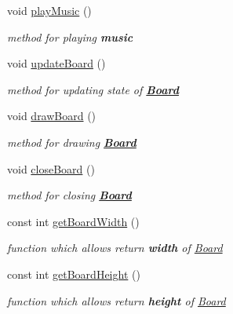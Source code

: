 \begin{DoxyCompactItemize}
\mbox{\label{class_board_ac7e87d3753a7535193a060e413571e7d}} 
void \mbox{\hyperlink{class_board_ac7e87d3753a7535193a060e413571e7d}{play\+Music}} ()
\begin{DoxyCompactList}\small\item\em {\itshape method} for playing {\bfseries{music}} \end{DoxyCompactList}\item 
\mbox{\label{class_board_aa1e9675f86e4e5b9436ef15e57536d1e}} 
void \mbox{\hyperlink{class_board_aa1e9675f86e4e5b9436ef15e57536d1e}{update\+Board}} ()
\begin{DoxyCompactList}\small\item\em {\itshape method} for updating state of {\bfseries{\mbox{\hyperlink{class_board}{Board}}}} \end{DoxyCompactList}\item 
\mbox{\label{class_board_a1845216283a171939dcb477dce3a17b8}} 
void \mbox{\hyperlink{class_board_a1845216283a171939dcb477dce3a17b8}{draw\+Board}} ()
\begin{DoxyCompactList}\small\item\em {\itshape method} for drawing {\bfseries{\mbox{\hyperlink{class_board}{Board}}}} \end{DoxyCompactList}\item 
\mbox{\label{class_board_afe98e3e2e3a202b42b9d6cd259d48e08}} 
void \mbox{\hyperlink{class_board_afe98e3e2e3a202b42b9d6cd259d48e08}{close\+Board}} ()
\begin{DoxyCompactList}\small\item\em {\itshape method} for closing {\bfseries{\mbox{\hyperlink{class_board}{Board}}}} \end{DoxyCompactList}\item 
\mbox{\label{class_board_aaadaaee98e38ef9fa97583f17b3b8f91}} 
const int \mbox{\hyperlink{class_board_aaadaaee98e38ef9fa97583f17b3b8f91}{get\+Board\+Width}} ()
\begin{DoxyCompactList}\small\item\em {\itshape function} which allows return {\bfseries{width}} of \mbox{\hyperlink{class_board}{Board}} \end{DoxyCompactList}\item 
\mbox{\label{class_board_a013ff890b20fc1bce46bc27d9b7c02c5}} 
const int \mbox{\hyperlink{class_board_a013ff890b20fc1bce46bc27d9b7c02c5}{get\+Board\+Height}} ()
\begin{DoxyCompactList}\small\item\em {\itshape function} which allows return {\bfseries{height}} of \mbox{\hyperlink{class_board}{Board}} \end{DoxyCompactList}\end{DoxyCompactItemize}


